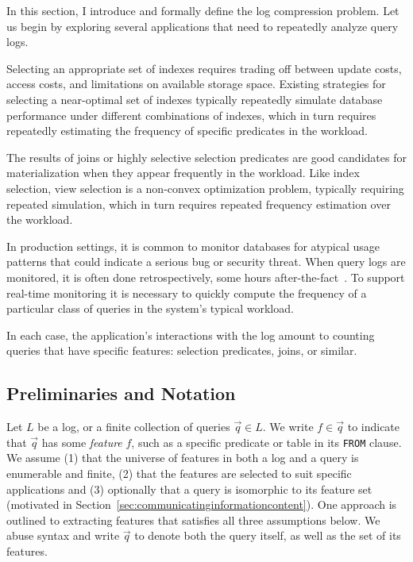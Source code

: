 In this section, I introduce and formally define the log compression problem.
Let us begin by exploring several applications that need to repeatedly analyze query logs.

Selecting an appropriate set of indexes requires trading off between update costs, access costs, and limitations on available storage space.
Existing strategies for selecting a near-optimal set of indexes typically repeatedly simulate database performance under different combinations of indexes, which in turn requires repeatedly estimating the frequency of specific predicates in the workload.

The results of joins or highly selective selection predicates are good candidates for materialization when they appear frequently in the workload.  
Like index selection, view selection is a non-convex optimization problem, typically requiring repeated simulation, which in turn requires repeated frequency estimation over the workload.

In production settings, it is common to monitor databases for atypical usage patterns that could indicate a serious bug or security threat.
When query logs are monitored, it is often done retrospectively, some hours after-the-fact~\cite{DBLP:conf/www/KulLXCCKU16}.  
To support real-time monitoring it is necessary to quickly compute the frequency of a particular class of queries in the system's typical workload.

\smallskip

In each case, the application's interactions with the log amount to counting queries that have specific features: selection predicates, joins, or similar.

\subsection{Preliminaries and Notation}
\label{sec:notation}
Let $L$ be a log, or a finite collection of queries $\vec q \in L$.
We write $f \in \vec q$ to indicate that $\vec q$ has some \emph{feature} $f$, such as a specific predicate or table in its \lstinline{FROM} clause.
We assume (1) that the universe of features in both a log and a query is enumerable and finite, (2) that the features are selected to suit specific applications and (3) optionally that a query is isomorphic to its feature set (motivated in Section~\ref{sec:communicatinginformationcontent}).  
One approach is outlined to extracting features that satisfies all three assumptions below.
We abuse syntax and write $\vec q$ to denote both the query itself, as well as the set of its features.  

